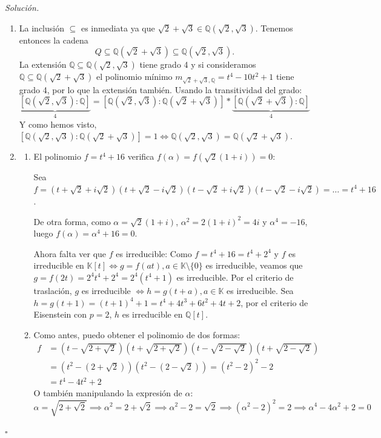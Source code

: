 \documentclass[10pt, spanish]{report}
\theoremstyle{definition}
\theoremstyle{custom}
\newenvironment{sol}{\textit{Solución.}}{\hfill$\square$}
\theoremstyle{remark}
\newcommand{\Q}{\mathbb{Q}}
\newcommand{\K}{\mathbb{K}}
\newcommand{\fecha}[1]{\marginpar{\underline{\footnotesize{#1}}}}
\begin{document}
\fecha{25/02}
\begin{sol}
    \begin{enumerate}
        \item La inclusión $\subseteq$ es inmediata ya que $\sqrt{2}+\sqrt{3}\in
            \Q(\sqrt{2},\sqrt{3})$. Tenemos entonces la cadena
            \[Q\subseteq\Q(\sqrt{2}+\sqrt{3})\subseteq\Q(\sqrt{2},\sqrt{3}).\]
            La extensión $\Q\subseteq\Q(\sqrt{2},\sqrt{3})$ tiene grado 4 y si
            consideramos $\Q\subseteq\Q(\sqrt{2}+\sqrt{3})$ el polinomio mínimo
            $m_{\sqrt{2}+\sqrt{3},\Q}=t^4-10t^2+1$ tiene grado 4, por lo que la
            extensión también. Usando la transitividad del grado:
            \[\underbrace{[\Q(\sqrt{2},\sqrt{3}):\Q]}_{4}=
                [\Q(\sqrt{2},\sqrt{3}):\Q(\sqrt{2}+\sqrt{3})]*
                \underbrace{[\Q(\sqrt{2}+\sqrt{3}):\Q]}_{4}\]
                Y como hemos visto,
                $[\Q(\sqrt{2},\sqrt{3}):\Q(\sqrt{2}+\sqrt{3})]=1\Leftrightarrow
                \Q(\sqrt{2},\sqrt{3})=\Q(\sqrt{2}+\sqrt{3})$.
        \item
            \begin{enumerate}
                \item El polinomio $f=t^4+16$ verifica $f(\alpha)=
                    f(\sqrt{2}(1+i))=0$:

                    Sea $f=(t+\sqrt{2}+i\sqrt{2})(t+\sqrt{2}-i\sqrt{2})
                    (t-\sqrt{2}+i\sqrt{2})(t-\sqrt{2}-i\sqrt{2})=\ldots=t^4+16$.

                    De otra forma, como $\alpha=\sqrt{2}(1+i)$,
                    $\alpha^2=2(1+i)^2=4i$ y $\alpha^4=-16$, luego
                    $f(\alpha)=\alpha^4+16=0$.

                    Ahora falta ver que $f$ es irreducible:
                    Como $f=t^4+16=t^4+2^4$ y $f$ es irreducible en $\K[t]
                    \Leftrightarrow g=f(at), a\in \K\setminus\{0\}$ es
                    irreducible, veamos que $g=f(2t)=2^4t^4+2^4=2^4(t^4+1)$ es
                    irreducible. Por el criterio de traslación, $g$ es
                    irreducible $\Leftrightarrow h=g(t+a), a\in\K$ es
                    irreducible. Sea $h=g(t+1)=(t+1)^4+1=t^4+4t^3+6t^2+4t+2$,
                    por el criterio de Eisenstein con $p=2$, $h$ es irreducible
                    en $\Q[t]$.
                \item Como antes, puedo obtener el polinomio de dos formas:
                    \begin{align*}
                        f&=(t-\sqrt{2+\sqrt{2}})(t+\sqrt{2+\sqrt{2}})
                        (t-\sqrt{2-\sqrt{2}})(t+\sqrt{2-\sqrt{2}})\\
                         &=(t^2-(2+\sqrt{2}))(t^2-(2-\sqrt{2}))=(t^2-2)^2-2\\
                         &=t^4-4t^2+2
                    \end{align*}
                    O también manipulando la expresión de $\alpha$:
                    \[\alpha=\sqrt{2+\sqrt{2}}\implies\alpha^2=2+\sqrt{2}
                     \implies\alpha^2-2=\sqrt{2}\implies(\alpha^2-2)^2=2\implies
                     \alpha^4-4\alpha^2+2=0\]


\end{enumerate}
\end{enumerate}
\end{sol}
\end{document}
